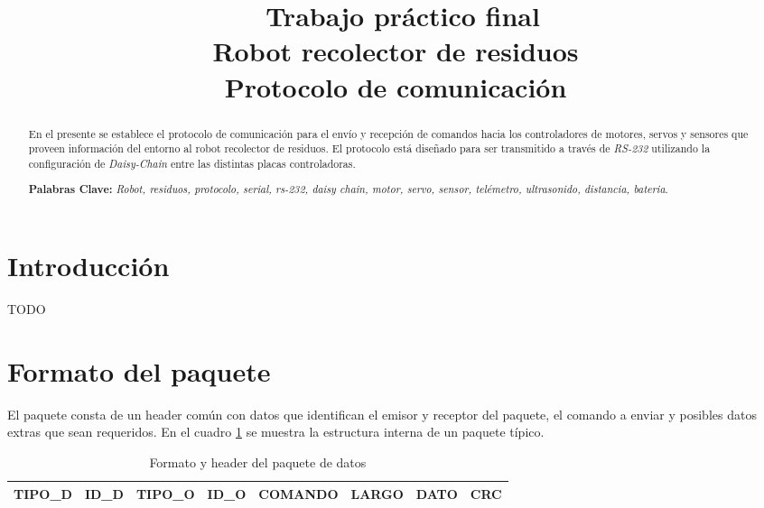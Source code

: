 \documentclass[a4paper,10pt]{article}
\begin{document}
\title{{\ Trabajo pr\'actico final \\ Robot recolector de residuos \\ Protocolo de comunicaci\'on}}



\maketitle

\begin{abstract}
En el presente se establece el protocolo de comunicaci\'on para el env\'io y recepci\'on de comandos hacia los controladores
de motores, servos y sensores que proveen informaci\'on del entorno al robot recolector de residuos. El protocolo est\'a dise\~nado
para ser transmitido a trav\'es de \emph{RS-232} utilizando la configuraci\'on de \emph{Daisy-Chain} entre las distintas placas controladoras.

\textbf{Palabras Clave: }\emph{Robot, residuos, protocolo, serial, rs-232, daisy chain, motor, servo, sensor, tel\'emetro, ultrasonido, distancia, bateria}.
\end{abstract}



\section{Introducci\'on}
\label{introduccion}

TODO

\section{Formato del paquete}
\label{formato_paquete}


El paquete consta de un header com\'un con datos que identifican el emisor y receptor del paquete, el comando a enviar y posibles datos extras que sean requeridos.
En el cuadro \ref{formato_paquete_tabla} se muestra la estructura interna de un paquete t\'ipico.

\begin{table}[h]
\begin{center}
\begin{tabular}{|c|c|c|c|c|c|c|c|}
\hline
TIPO\_D & ID\_D & TIPO\_O & ID\_O & COMANDO & LARGO & DATO & CRC \\
\hline
\end{tabular}
\caption{Formato y header del paquete de datos}
\label{formato_paquete_tabla}
\end{center}
\end{table}
\end{document}
